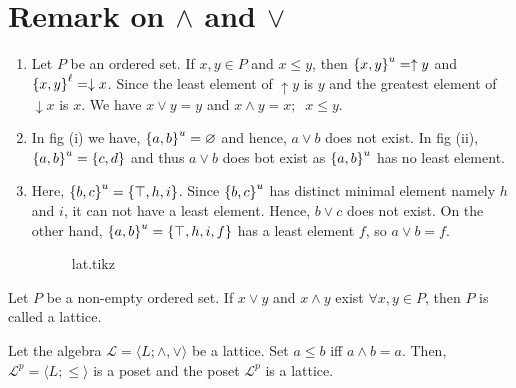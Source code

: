 \documentclass[../main-sheet.tex]{subfiles}
\begin{document}
\section{Remark on \(\wedge\) and \(\vee\)}
\begin{enumerate}
    \item Let \(P\) be an ordered set. If \(x,y\in P\) and \(x\leq y\), then \(\left\{x,y\right\}^{u}=\uparrow y\) and \(\left\{x,y\right\}^\ell=\downarrow x\). Since the least element of \(\uparrow y\) is \(y\) and the greatest element of \(\downarrow x\) is \(x\). We have \(x\vee y=y\) and \(x\wedge y=x;\;\;x\leq y\).
    \item In fig (i) we have, \(\left\{a,b\right\}^u=\varnothing\) and hence, \(a\vee b\) does not exist. In fig (ii), \(\left\{a,b\right\}^u=\left\{c,d\right\}\) and thus \(a\vee b\) does bot exist as \(\left\{a,b\right\}^u\) has no least element.
    \item Here, \(\left\{b,c\right\}^u=\left\{\top,h,i\right\}\). Since \(\left\{b,c\right\}^u\) has distinct minimal element namely \(h\) and \(i\), it can not have a least element. Hence, \(b\vee c\) does not exist. On the other hand, \(\left\{a,b\right\}^u=\left\{\top,h,i,f\right\}\) has a least element \(f\), so \(a\vee b=f\). 
    \begin{figure}[H]
        \centering
        {lat.tikz}
    \end{figure}
\end{enumerate}
\begin{defn}
    Let \(P\) be a non-empty ordered set. If \(x\vee y\) and \(x\wedge y\) exist \(\forall x,y\in P\), then \(P\) is called a lattice.
\end{defn}
\begin{thm}
    Let the algebra \(\mathcal{L}=\langle L; \wedge,\vee\rangle\) be a lattice.
    Set \(a\leq b\) iff \(a\wedge b=a\).
    Then, \(\mathcal{L}^p=\langle L;\leq  \rangle\) is a poset and the poset \(\mathcal{L}^p\) is a lattice. 
\end{thm}
\end{document}
